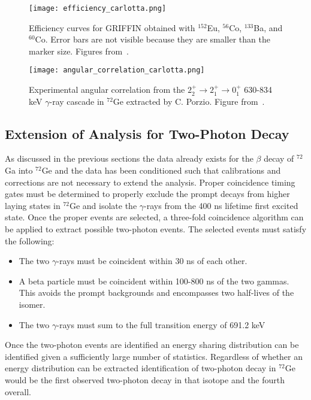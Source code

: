 \documentclass[cnatzke_thesis_proposal.tex]{subfiles}
\begin{document}
\begin{figure}[htbp]
  \centering
  \texttt{[image: efficiency\_carlotta.png]}
  \caption{Efficiency curves for GRIFFIN obtained with $^{152}$Eu, $^{56}$Co, $^{133}$Ba, and $^{60}$Co. Error bars are not visible because they are smaller than the marker size. Figures from~\cite{porzio_configuration_2021}.}
  \label{fig:efficiency_carlotta}
\end{figure}

\begin{figure}[htbp]
  \centering
  \texttt{[image: angular\_correlation\_carlotta.png]}
  \caption{Experimental angular correlation from the $2_2^+ \rightarrow 2_1^+ \rightarrow 0_1^+$ 630-834 keV $\gamma$-ray cascade in $^{72}$Ge extracted by C. Porzio. Figure from~\cite{porzio_configuration_2021}.}
  \label{fig:angular_correlation_carlotta}
\end{figure}


\subsection{Extension of Analysis for Two-Photon Decay}
As discussed in the previous sections the data already exists for the $\beta$ decay of $^{72}$Ga into $^{72}$Ge and the data has been conditioned such that calibrations and corrections are not necessary to extend the analysis. 
Proper coincidence timing gates must be determined to properly exclude the prompt decays from higher laying states in $^{72}$Ge and isolate the $\gamma$-rays from the 400 ns lifetime first excited state. 
Once the proper events are selected, a three-fold coincidence algorithm can be applied to extract possible two-photon events. 
The selected events must satisfy the following: 

\begin{itemize}
  \item The two $\gamma$-rays must be coincident within 30 ns of each other.
  \item A beta particle must be coincident within 100-800 ns of the two gammas. This avoids the prompt backgrounds and encompasses two half-lives of the isomer. 
  \item The two $\gamma$-rays must sum to the full transition energy of 691.2 keV
\end{itemize}

Once the two-photon events are identified an energy sharing distribution can be identified given a sufficiently large number of statistics. 
Regardless of whether an energy distribution can be extracted identification of two-photon decay in $^{72}$Ge would be the first observed two-photon decay in that isotope and the fourth overall. 


\end{document}
